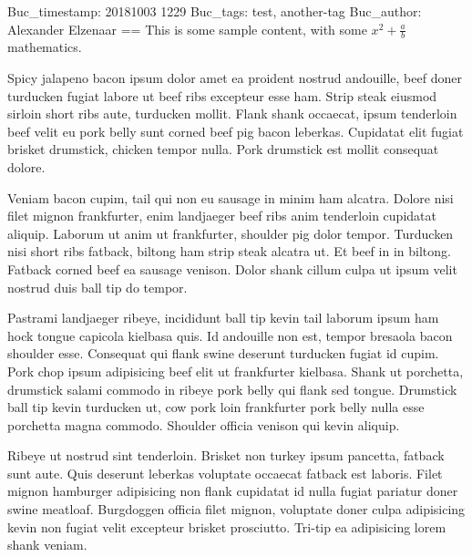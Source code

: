 Buc_timestamp: 20181003 1229
Buc_tags: test, another-tag
Buc_author: Alexander Elzenaar
==
This is some sample content, with some $ x^2 + \frac{a}{b} $ mathematics.

Spicy jalapeno bacon ipsum dolor amet ea proident nostrud andouille, beef doner turducken fugiat labore ut beef ribs excepteur esse ham. Strip steak eiusmod sirloin short ribs aute, turducken mollit. Flank shank occaecat, ipsum tenderloin beef velit eu pork belly sunt corned beef pig bacon leberkas. Cupidatat elit fugiat brisket drumstick, chicken tempor nulla. Pork drumstick est mollit consequat dolore.

Veniam bacon cupim, tail qui non eu sausage in minim ham alcatra. Dolore nisi filet mignon frankfurter, enim landjaeger beef ribs anim tenderloin cupidatat aliquip. Laborum ut anim ut frankfurter, shoulder pig dolor tempor. Turducken nisi short ribs fatback, biltong ham strip steak alcatra ut. Et beef in in biltong. Fatback corned beef ea sausage venison. Dolor shank cillum culpa ut ipsum velit nostrud duis ball tip do tempor.

Pastrami landjaeger ribeye, incididunt ball tip kevin tail laborum ipsum ham hock tongue capicola kielbasa quis. Id andouille non est, tempor bresaola bacon shoulder esse. Consequat qui flank swine deserunt turducken fugiat id cupim. Pork chop ipsum adipisicing beef elit ut frankfurter kielbasa. Shank ut porchetta, drumstick salami commodo in ribeye pork belly qui flank sed tongue. Drumstick ball tip kevin turducken ut, cow pork loin frankfurter pork belly nulla esse porchetta magna commodo. Shoulder officia venison qui kevin aliquip.

Ribeye ut nostrud sint tenderloin. Brisket non turkey ipsum pancetta, fatback sunt aute. Quis deserunt leberkas voluptate occaecat fatback est laboris. Filet mignon hamburger adipisicing non flank cupidatat id nulla fugiat pariatur doner swine meatloaf. Burgdoggen officia filet mignon, voluptate doner culpa adipisicing kevin non fugiat velit excepteur brisket prosciutto. Tri-tip ea adipisicing lorem shank veniam.
